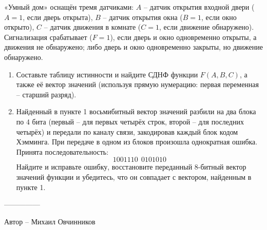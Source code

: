 \question
«Умный дом» оснащён тремя датчиками: $A$ -- датчик открытия входной двери ($A=1$, если дверь открыта), $B$ -- датчик открытия окна ($B=1$, если окно открыто), $C$ -- датчик движения в комнате ($C=1$, если движение обнаружено). Сигнализация срабатывает ($F=1$), если дверь и окно одновременно открыты, а движения не обнаружено; либо дверь и окно одновременно закрыты, но движение обнаружено.

\begin{enumerate}
\item Составьте таблицу истинности и найдите СДНФ функции $F(A,B,C)$, а также её вектор значений (используя прямую нумерацию: первая переменная -- старший разряд).
\item Найденный в пункте 1 восьмибитный вектор значений разбили на два блока по 4 бита (первый -- для первых четырёх строк, второй -- для последних четырёх) и передали по каналу связи, закодировав каждый блок кодом Хэмминга. При передаче в одном из блоков произошла однократная ошибка. Принята последовательность:
\[
1001110\ \ 0101010
\]
Найдите и исправьте ошибку, восстановите переданный 8-битный вектор значений функции и убедитесь, что он совпадает с вектором, найденным в пункте 1.
\end{enumerate}
---------------

Автор -- Михаил Овчинников 